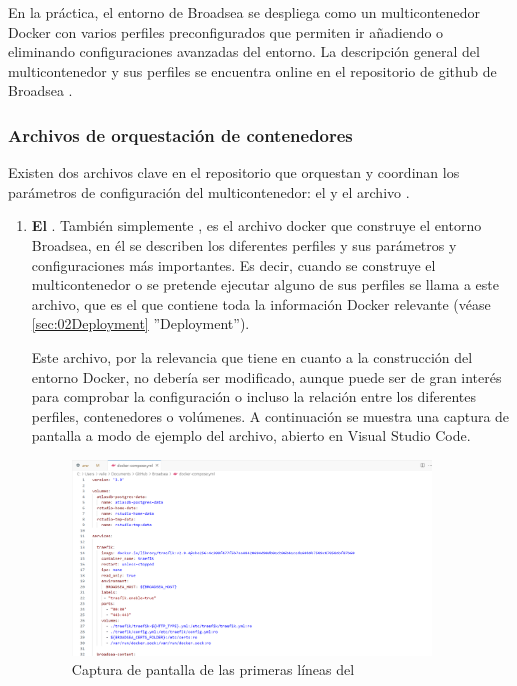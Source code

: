 En la práctica, el entorno de Broadsea se despliega como un multicontenedor Docker con varios perfiles preconfigurados que permiten ir añadiendo o eliminando configuraciones avanzadas del entorno. La descripción general del multicontenedor y sus perfiles se encuentra online en el repositorio de github de Broadsea \cite{githubBroadsea}.  

\subsubsection{Archivos de orquestación de contenedores}

Existen dos archivos clave en el repositorio que orquestan y coordinan los parámetros de configuración del multicontenedor: el  y el archivo .

\begin{enumerate}

    \item \textbf{El }. También simplemente , es el archivo docker que construye el entorno Broadsea, en él se describen los diferentes perfiles y sus parámetros y configuraciones más importantes. Es decir, cuando se construye el multicontenedor o se pretende ejecutar alguno de sus perfiles se llama a este archivo, que es el que contiene toda la información Docker relevante (véase \ref{sec:02Deployment} ''Deployment'').

    Este archivo, por la relevancia que tiene en cuanto a la construcción del entorno Docker, no debería ser modificado, aunque puede ser de gran interés para comprobar la configuración o incluso la relación entre los diferentes perfiles, contenedores o volúmenes. A continuación se muestra una captura de pantalla a modo de ejemplo del archivo, abierto en Visual Studio Code.

\begin{figure}[H]
    \centering
    \includegraphics[width=0.90\textwidth]{figures/dockerCompose.png}
    \caption{Captura de pantalla de las primeras líneas del }
    \label{fig:dockerCompose}
\end{figure}


\end{enumerate}
